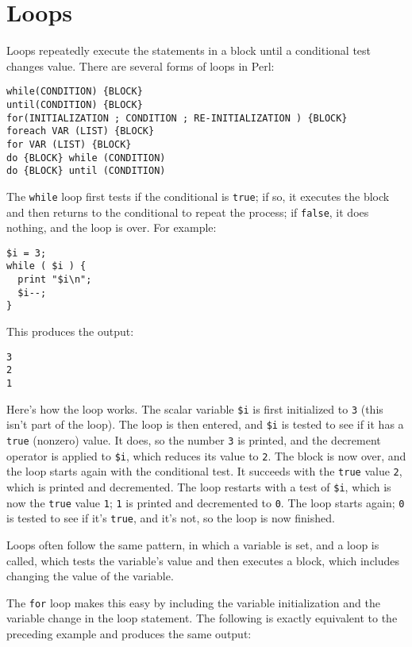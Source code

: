 \section{Loops}
Loops repeatedly execute the statements in a block until a conditional test changes value. There are several forms of loops in Perl:

\begin{lstlisting}
while(CONDITION) {BLOCK}
until(CONDITION) {BLOCK}
for(INITIALIZATION ; CONDITION ; RE-INITIALIZATION ) {BLOCK}
foreach VAR (LIST) {BLOCK}
for VAR (LIST) {BLOCK}
do {BLOCK} while (CONDITION)
do {BLOCK} until (CONDITION)
\end{lstlisting}

The \verb|while| loop first tests if the conditional is \verb|true|; if so, it executes the block and then returns to the conditional to repeat the process; if \verb|false|, it does nothing, and the loop is over. For example:

\begin{lstlisting}
$i = 3;
while ( $i ) {
  print "$i\n";
  $i--;
}
\end{lstlisting}

This produces the output:

\begin{lstlisting}
3
2
1
\end{lstlisting}

Here's how the loop works. The scalar variable \verb|$i| is first initialized to \verb|3| (this isn't part of the loop). The loop is then entered, and \verb|$i| is tested to see if it has a \verb|true| (nonzero) value. It does, so the number \verb|3| is printed, and the decrement operator is applied to \verb|$i|, which reduces its value to \verb|2|. The block is now over, and the loop starts again with the conditional test. It succeeds with the \verb|true| value \verb|2|, which is printed and decremented. The loop restarts with a test of \verb|$i|, which is now the \verb|true| value \verb|1|; \verb|1| is printed and decremented to \verb|0|. The loop starts again; \verb|0| is tested to see if it's \verb|true|, and it's not, so the loop is now finished.

Loops often follow the same pattern, in which a variable is set, and a loop is called, which tests the variable's value and then executes a block, which includes changing the value of the variable.

The \verb|for| loop makes this easy by including the variable initialization and the variable change in the loop statement. The following is exactly equivalent to the preceding example and produces the same output:

